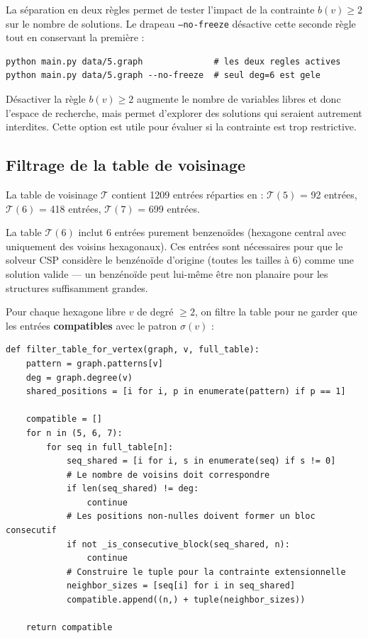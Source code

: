 \documentclass[12pt,a4paper]{article}
\theoremstyle{definition}
\begin{document}
La séparation en deux règles permet de tester l'impact de la contrainte $b(v) \geq 2$ sur
le nombre de solutions. Le drapeau \texttt{--no-freeze} désactive cette seconde règle tout
en conservant la première :

\begin{lstlisting}[style=benzai]
python main.py data/5.graph              # les deux regles actives
python main.py data/5.graph --no-freeze  # seul deg=6 est gele
\end{lstlisting}

\begin{remarque}
  Désactiver la règle $b(v) \geq 2$ augmente le nombre de variables libres et donc l'espace
  de recherche, mais permet d'explorer des solutions qui seraient autrement interdites. Cette
  option est utile pour évaluer si la contrainte est trop restrictive.
\end{remarque}

\subsection{Filtrage de la table de voisinage}

La table de voisinage $\mathcal{T}$ contient 1209 entrées réparties en :
$\mathcal{T}(5)$ = 92 entrées, $\mathcal{T}(6)$ = 418 entrées, $\mathcal{T}(7)$ = 699 entrées.

\begin{remarque}
  La table $\mathcal{T}(6)$ inclut 6 entrées purement benzenoïdes (hexagone central avec
  uniquement des voisins hexagonaux). Ces entrées sont nécessaires pour que le solveur CSP
  considère le benzénoïde d'origine (toutes les tailles à 6) comme une solution valide —
  un benzénoïde peut lui-même être non planaire pour les structures suffisamment grandes.
\end{remarque}

Pour chaque hexagone libre $v$ de degré $\geq 2$, on filtre la table pour ne garder que les
entrées \textbf{compatibles} avec le patron $\sigma(v)$ :

\begin{lstlisting}
def filter_table_for_vertex(graph, v, full_table):
    pattern = graph.patterns[v]
    deg = graph.degree(v)
    shared_positions = [i for i, p in enumerate(pattern) if p == 1]

    compatible = []
    for n in (5, 6, 7):
        for seq in full_table[n]:
            seq_shared = [i for i, s in enumerate(seq) if s != 0]
            # Le nombre de voisins doit correspondre
            if len(seq_shared) != deg:
                continue
            # Les positions non-nulles doivent former un bloc consecutif
            if not _is_consecutive_block(seq_shared, n):
                continue
            # Construire le tuple pour la contrainte extensionnelle
            neighbor_sizes = [seq[i] for i in seq_shared]
            compatible.append((n,) + tuple(neighbor_sizes))

    return compatible
\end{lstlisting}
\end{document}
